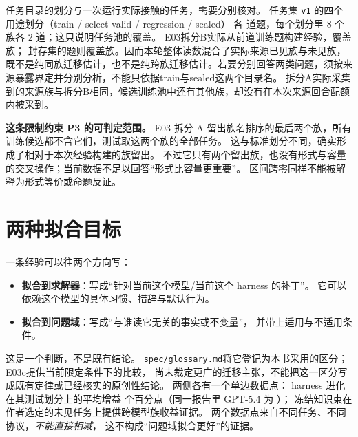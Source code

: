 \begin{sloppypar}
任务目录的划分与一次运行实际接触的任务，需要分别核对。
任务集 \texttt{v1} 的四个用途划分（train / select-valid / regression / sealed）
各  道题，每个划分里 8 个族各 2 道；这只说明任务池的覆盖。
E03拆分B实际从前道训练题构建经验，覆盖族；
封存集的题则覆盖族。因而本轮整体读数混合了实际来源已见族与未见族，
既不是纯同族迁移估计，也不是纯跨族迁移估计。若要分别回答两类问题，须按来源暴露界定并分别分析，不能只依据train与sealed这两个目录名。
拆分A实际采集到的来源族与拆分B相同，候选训练池中还有其他族，却没有在本次来源回合配额内被采到。
\end{sloppypar}

\begin{principlebox}
\textbf{这条限制约束 P3 的可判定范围。}
E03 拆分 A 留出族名排序的最后两个族，所有训练候选都不含它们，测试取这两个族的全部任务。
这与标准划分不同，确实形成了相对于本次经验构建的族留出。
不过它只有两个留出族，也没有形式与容量的交叉操作；当前数据不足以回答“形式比容量更重要”。
区间跨零同样不能被解释为形式等价或命题反证。

\end{principlebox}

\section{两种拟合目标}
\label{sec:ch05-fit}



一条经验可以往两个方向写：
\begin{itemize}
  \item \textbf{拟合到求解器}：写成``针对当前这个模型/当前这个 harness 的补丁''。
        它可以依赖这个模型的具体习惯、措辞与默认行为。
  \item \textbf{拟合到问题域}：写成``与谁读它无关的事实或不变量''，
        并带上适用与不适用条件。
\end{itemize}

这是一个判断，不是既有结论。
\texttt{spec/glossary.md}将它登记为本书采用的区分；E03c提供当前限定条件下的比较，
尚未裁定更广的迁移主张，不能把这一区分写成既有定律或已经核实的原创性结论。
两侧各有一个单边数据点：
harness 进化在其测试划分上的平均增益  个百分点（同一报告里 GPT-5.4 为 ）\cite{harness-eval-2607}；
冻结知识束在作者选定的未见任务上提供跨模型族收益证据\cite{ksi-2607}。
两个数据点来自不同任务、不同协议，\emph{不能直接相减}，
这不构成``问题域拟合更好''的证据。

